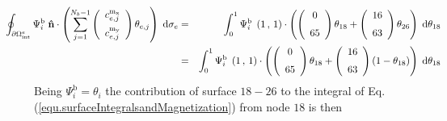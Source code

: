 \documentclass[11pt]{article}
\renewcommand{\d}{\mathrm{d}} %
\newcommand{\rv}[1]{\ensuremath{\mathbf{#1}}} %
\begin{document}
\begin{eqnarray}
  \hspace{-1cm}
  \oint_{\partial \Omega^{e}_\mathrm{int}} 
  \Psi^\mathrm{b}_{i} \;
  \rv{\hat{n}} 
  \cdot 
  \left(
    \sum_{j=1}^{N_b-1} 
    \left(
      \begin {array}{c}
        c^\mathrm{m_x}_{e,j}\\
        \noalign{\medskip}
        c^\mathrm{m_y}_{e,j}\\
      \end {array}
    \right)
    \theta_{e,j}
  \right) 
  \;  \d\sigma_e
  &=&
  \int_{0}^{1} 
  \Psi^\mathrm{b}_{i} \;
  \left( 1\,,\, 1 \right) 
  \cdot 
  \left(
    \left(
      \begin {array}{c}
        0\\
        \noalign{\medskip}
        65
      \end {array}
    \right)
    \theta_{18}
    +
    \left(
      \begin {array}{c}
        16\\
        \noalign{\medskip}
        63
      \end {array}
    \right)
    \theta_{26}
  \right) 
  \;  \d \theta_{18}
  \\ &=&
  \int_{0}^{1} 
  \Psi^\mathrm{b}_{i} \;
  \left( 1\,,\, 1 \right) 
  \cdot 
  \left(
    \left(
      \begin {array}{c}
        0\\
        \noalign{\medskip}
        65
      \end {array}
    \right)
    \theta_{18}
    +
    \left(
      \begin {array}{c}
        16\\
        \noalign{\medskip}
        63
      \end {array}
    \right)
    ( 1- \theta_{18})
  \right) 
  \;  \d \theta_{18}
  \nonumber
  \label{equ.normalProduct_c}
\end{eqnarray}
Being $\Psi^\mathrm{b}_{i} = \theta_{i}$ the contribution of surface
$18-26$ to the integral of Eq.(\ref{equ.surfaceIntegralsandMagnetization}) 
from node $18$ is then   
\end{document}
